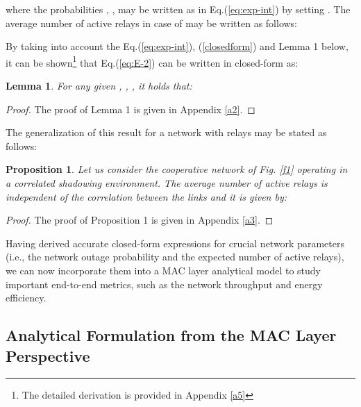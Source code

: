 \documentclass[12pt,draftcls, onecolumn]{IEEEtran}
\newtheorem{proposition}{Proposition}
\newtheorem{lemma}{Lemma}
\begin{document}
\vspace{-2pt}
\begingroup
{\setlength{\arraycolsep}{0em}}
\endgroup
\vspace{-2pt}

\noindent where the probabilities , ,  may be written as in Eq.(\ref{eq:exp-int}) by setting . The average number of active relays in case of  may be written as follows:

\begingroup

\endgroup

\vspace{-1pt}

By taking into account the Eq.(\ref{eq:exp-int}), (\ref{closedform}) and Lemma 1 below, it can be shown\footnote{The detailed derivation is provided in Appendix \ref{a5}} that Eq.(\ref{eq:E-2}) can be written in closed-form as:
\vspace{-1pt}
\begingroup

\endgroup

\begin{lemma}
For any given , , ,  it holds that:

\begingroup

\endgroup
\end{lemma}
\begin{proof}
The proof of Lemma 1 is given in Appendix \ref{a2}.
\end{proof}

\noindent The generalization of this result for a network with  relays may be stated as follows:

\begin{proposition}
Let us consider the cooperative network of Fig. \ref{f1} operating in a correlated shadowing environment. The average number of active relays  is independent of the correlation between the links and it is given by:

\begingroup

\endgroup
\end{proposition}
\begin{proof}
The proof of Proposition 1 is given in Appendix \ref{a3}.
\end{proof}

Having derived accurate closed-form expressions for crucial network parameters (i.e., the network outage probability and the expected number of active relays), we can now incorporate them into a MAC layer analytical model to study important end-to-end metrics, such as the network throughput and energy efficiency.

\subsection{Analytical Formulation from the MAC Layer Perspective}
\label{sec:analysis_mac}
\end{document}
